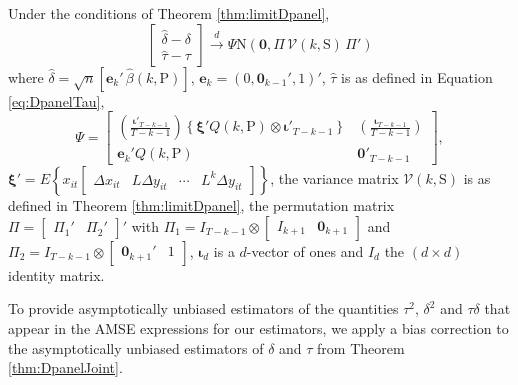 \begin{thm}
  \label{thm:DpanelJoint}
  Under the conditions of Theorem \ref{thm:limitDpanel},
  \[
    \left[
      \begin{array}{c} 
        \widehat{\delta} - \delta \\ \widehat{\tau} - \tau 
      \end{array} 
    \right] \overset{d}{\rightarrow} \Psi \mbox{N}\left(\mathbf{0}, \Pi\,\mathcal{V}\left(k,\text{S}\right)\,\Pi'\right)
  \]
  where $\widehat{\delta} = \sqrt{n}[ \mathbf{e}_k' \,\widehat{\beta}(k,\text{P})]$, $\mathbf{e}_k = (0, \mathbf{0}_{k-1}', 1)'$,  $\widehat{\tau}$ is as defined in Equation \ref{eq:DpanelTau}, 
\[
  \Psi = \left[
  \begin{array}{cc}
    \displaystyle\left( \frac{\boldsymbol{\iota}'_{T-k-1}}{T-k-1} \right)  \left\{ \boldsymbol{\xi}' Q(k,\text{P}) \otimes \boldsymbol{\iota}'_{T-k-1} \right\}& \displaystyle \left(\frac{\boldsymbol{\iota}_{T-k-1}}{T-k-1}\right) \\ 
    \mathbf{e}_k' Q(k,\text{P}) & \mathbf{0}'_{T-k-1}
  \end{array}
\right],
\]
  $\boldsymbol{\xi}' = E\left\{ x_{it} \left[
    \begin{array}{cccc}
       \Delta x_{it} & L \Delta y_{it} & \cdots & L^k \Delta y_{it}   \end{array} \right]\right\}$,
  the variance matrix $\mathcal{V}(k,\text{S})$ is as defined in Theorem \ref{thm:limitDpanel}, the permutation matrix $\Pi = \left[
  \begin{array}{cc}
    \Pi_1' & \Pi_2'
  \end{array}
\right]'$ with $\Pi_1 = I_{T-k-1} \otimes \left[
\begin{array}{cc}
  I_{k+1} & \mathbf{0}_{k+1}
\end{array}
\right]$ and $\Pi_2 = I_{T-k-1}\otimes \left[
\begin{array}{cc}
  \mathbf{0}_{k+1}' & 1
\end{array}
\right]$,
  $\boldsymbol{\iota}_{d}$ is a $d$-vector of ones and $I_d$ the $(d\times d)$ identity matrix.
\end{thm}

To provide asymptotically unbiased estimators of the quantities $\tau^2$, $\delta^2$ and $\tau\delta$ that appear in the AMSE expressions for our estimators, we apply a bias correction to the asymptotically unbiased estimators of $\delta$ and $\tau$ from Theorem \ref{thm:DpanelJoint}.

